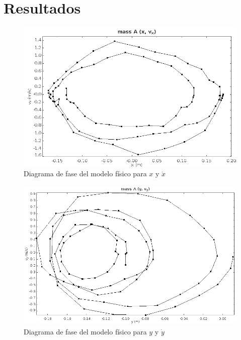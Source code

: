 \section{Resultados}


\begin{figure}[h]
 \centering
 \includegraphics[scale=0.45]{./img/tracker_poc_phasediagram_x_vx.png}
 \caption{Diagrama de fase del modelo físico para $x$ y $\dot{x}$}
 \label{fig: tracker phase diagram x vx}
\end{figure}

\begin{figure}[h]
 \centering
 \includegraphics[scale=0.45]{./img/tracker_poc_phasediagram_y_vy.png}
 \caption{Diagrama de fase del modelo físico para $y$ y $\dot{y}$}
 \label{fig: tracker phase diagram y vy}
\end{figure}


